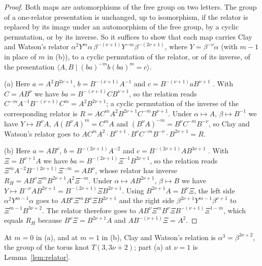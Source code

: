 \begin{proof}
Both maps are automorphisms of the free group on two letters. The group of a one-relator presentation is
unchanged, up to isomorphism, if the relator is replaced by its image under an automorphism of the free
group, by a cyclic permutation, or by its inverse. So it suffices to show that each map carries
Clay and Watson's relator $\alpha^2Y^m\alpha\,\beta^{-(\nu+1)}Y^{-m}\beta^{-(2\nu+1)}$, where $Y=\beta^{-\nu}\alpha$ (with
$m-1$ in place of $m$ in (b)), to a cyclic permutation of the relator, or of its inverse, of the presentation
$\langle A,B\mid(ba)^{-m}b(ba)^m=c\rangle$.

(a) Here $a=A^2B^{2\nu+1}$, $b=B^{-(\nu+1)}A^{-1}$ and $c=B^{-(\nu+1)}aB^{\nu+1}$ \cite[(3.2)]{WuebbenV}. With $C=AB^\nu$ we
have $ba=B^{-(\nu+1)}CB^{\nu+1}$, so the relation reads $C^{-m}A^{-1}B^{-(\nu+1)}C^m=A^2B^{2\nu+1}$; a cyclic permutation
of the inverse of the corresponding relator is $R=AC^mA^2B^{2\nu+1}C^{-m}B^{\nu+1}$. Under $\alpha\mapsto A$,
$\beta\mapsto B^{-1}$ we have $Y\mapsto B^\nu A$, $A(B^\nu A)^m=C^mA$ and $(B^\nu A)^{-m}=B^\nu C^{-m}B^{-\nu}$, so Clay and
Watson's relator goes to $AC^mA^2\cdot B^{\nu+1}\cdot B^\nu C^{-m}B^{-\nu}\cdot B^{2\nu+1}=R$.

(b) Here $a=AB^\nu$, $b=B^{-(2\nu+1)}A^{-2}$ and $c=B^{-(2\nu+1)}AB^{3\nu+1}$ \cite[(3.2)]{WuebbenV}. With $\Xi=B^{\nu+1}A$ we
have $ba=B^{-(2\nu+1)}\Xi^{-1}B^{2\nu+1}$, so the relation reads $\Xi^mA^{-2}B^{-(2\nu+1)}\Xi^{-m}=AB^\nu$, whose relator has
inverse $R_H=AB^\nu \Xi^mB^{2\nu+1}A^2\Xi^{-m}$. Under $\alpha\mapsto AB^{2\nu+1}$, $\beta\mapsto B$ we have
$Y\mapsto B^{-\nu}AB^{2\nu+1}=B^{-(2\nu+1)}\Xi B^{2\nu+1}$. Using $B^{2\nu+1}A=B^\nu \Xi$, the left side
$\alpha^2Y^{m-1}\alpha$ goes to $AB^\nu \Xi^mB^\nu \Xi B^{2\nu+1}$ and the right side $\beta^{2\nu+1}Y^{m-1}\beta^{\nu+1}$ to
$\Xi^{m-1}B^{3\nu+2}$. The relator therefore goes to $AB^\nu \Xi^mB^\nu \Xi B^{-(\nu+1)}\Xi^{1-m}$, which equals $R_H$ because
$B^\nu \Xi=B^{2\nu+1}A$ and $AB^{-(\nu+1)}\Xi=A^2$.
\end{proof}

At $m=0$ in (a), and at $m=1$ in (b), Clay and Watson's relation is $\alpha^3=\beta^{3\nu+2}$, the group of the torus
knot $T(3,3\nu+2)$; part (a) at $\nu=1$ is Lemma~\ref{lem:relator}.

